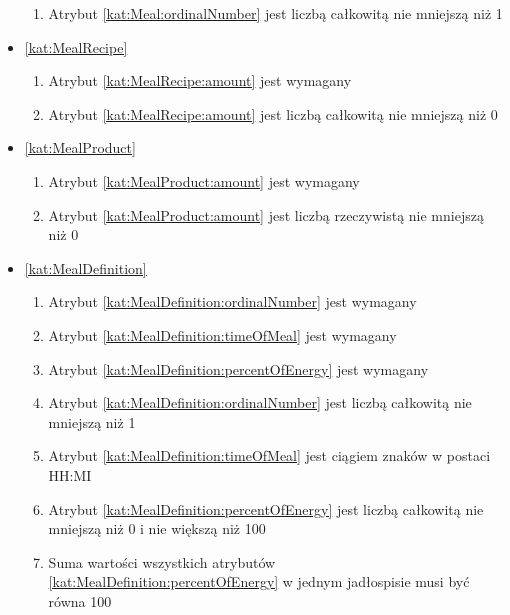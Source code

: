 \begin{itemize}[label={\textbf{Ograniczenia dla}}, wide, labelwidth=!, labelindent=0pt]
\begin{enumerate}[label={\textbf{OGR/\protect\threedigits{\arabic{enumi}}}}, wide, labelwidth=!, align=left, leftmargin=3cm, resume]
        \item Atrybut \ref{kat:Meal:ordinalNumber} jest liczbą całkowitą nie mniejszą niż 1
    \end{enumerate}

    \item\ref{kat:MealRecipe}
    \begin{enumerate}[label={\textbf{OGR/\protect\threedigits{\arabic{enumi}}}}, wide, labelwidth=!, align=left, leftmargin=3cm, resume]
        \item Atrybut \ref{kat:MealRecipe:amount} jest wymagany

        \item Atrybut \ref{kat:MealRecipe:amount} jest liczbą całkowitą nie mniejszą niż 0
    \end{enumerate}

    \item\ref{kat:MealProduct}
    \begin{enumerate}[label={\textbf{OGR/\protect\threedigits{\arabic{enumi}}}}, wide, labelwidth=!, align=left, leftmargin=3cm, resume]
        \item Atrybut \ref{kat:MealProduct:amount} jest wymagany

        \item Atrybut \ref{kat:MealProduct:amount} jest liczbą rzeczywistą nie mniejszą niż 0
    \end{enumerate}

    \item\ref{kat:MealDefinition}
    \begin{enumerate}[label={\textbf{OGR/\protect\threedigits{\arabic{enumi}}}}, wide, labelwidth=!, align=left, leftmargin=3cm, resume]
        \item Atrybut \ref{kat:MealDefinition:ordinalNumber} jest wymagany
        \item Atrybut \ref{kat:MealDefinition:timeOfMeal} jest wymagany
        \item Atrybut \ref{kat:MealDefinition:percentOfEnergy} jest wymagany

        \item Atrybut \ref{kat:MealDefinition:ordinalNumber} jest liczbą całkowitą nie mniejszą niż 1
        \item Atrybut \ref{kat:MealDefinition:timeOfMeal} jest ciągiem znaków w postaci HH:MI
        \item Atrybut \ref{kat:MealDefinition:percentOfEnergy} jest liczbą całkowitą nie mniejszą niż 0 i nie większą niż 100
        \item Suma wartości wszystkich atrybutów \ref{kat:MealDefinition:percentOfEnergy} w jednym jadłospisie musi być równa 100
    \end{enumerate}


\end{itemize}
